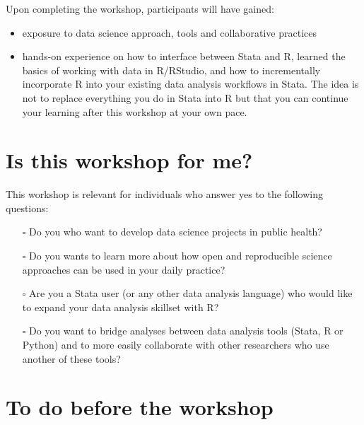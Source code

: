 \documentclass[
  letterpaper,
  DIV=11,
  numbers=noendperiod]{scrreprt}
\providecommand{\tightlist}{%
  \setlength{\itemsep}{0pt}\setlength{\parskip}{0pt}}\usepackage{longtable,booktabs,array}
\begin{document}
Upon completing the workshop, participants will have gained:

\begin{itemize}
\tightlist
\item
  exposure to data science approach, tools and collaborative practices
\item
  hands-on experience on how to interface between Stata and R, learned
  the basics of working with data in R/RStudio, and how to incrementally
  incorporate R into your existing data analysis workflows in Stata. The
  idea is not to replace everything you do in Stata into R but that you
  can continue your learning after this workshop at your own pace.
\end{itemize}

\hypertarget{is-this-workshop-for-me}{%
\section{Is this workshop for me?}\label{is-this-workshop-for-me}}

This workshop is relevant for individuals who answer yes to the
following questions:

\begin{itemize}
\tightlist
\item[$\square$]
  Do you who want to develop data science projects in public health?
\item[$\square$]
  Do you wants to learn more about how open and reproducible science
  approaches can be used in your daily practice?
\item[$\square$]
  Are you a Stata user (or any other data analysis language) who would
  like to expand your data analysis skillset with R?
\item[$\square$]
  Do you want to bridge analyses between data analysis tools (Stata, R
  or Python) and to more easily collaborate with other researchers who
  use another of these tools?
\end{itemize}

\hypertarget{to-do-before-the-workshop}{%
\section{To do before the workshop}\label{to-do-before-the-workshop}}
\end{document}
